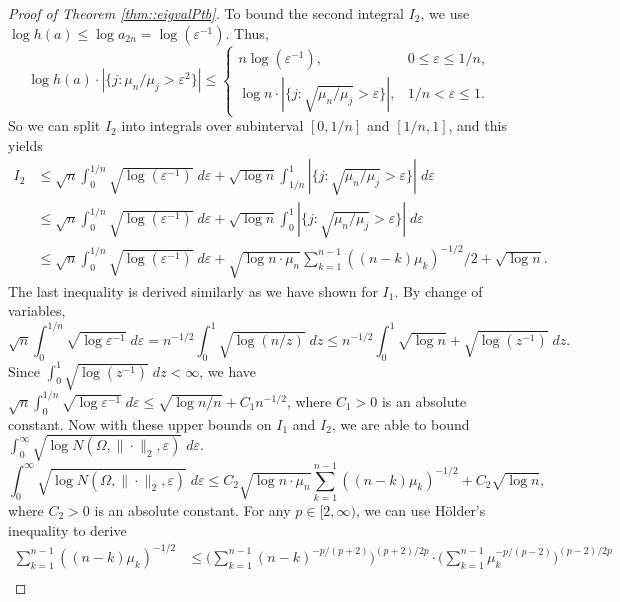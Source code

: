 \documentclass[12pt]{article}%
\theoremstyle{plain}%
\theoremstyle{remark}
\begin{document}
\begin{proof}[Proof of Theorem \ref{thm::eigvalPtb}]
To bound the second integral $I_2$, we use $\log h(a) \le \log a_{2n} = \log (\varepsilon^{-1})$. Thus, 
\begin{equation*}
\log h(a) \cdot  | \{ j: \mu_n / \mu_j > \varepsilon^2 \}| \le \begin{cases}
n \log (\varepsilon^{-1}), & 0 \le \varepsilon \le 1/n,  \\
\log n \cdot | \{ j: \sqrt{\mu_n / \mu_j} > \varepsilon \}|, & 1/n < \varepsilon \le 1.
\end{cases}
\end{equation*}
So we can split $I_2$ into integrals over subinterval $[0,1/n]$ and $[1/n, 1]$, and this yields
\begin{align*}
I_2 &\le \sqrt{n} \int_0^{1/n} \sqrt{ \log (\varepsilon^{-1}) }\; d\varepsilon + \sqrt{\log n} \int_{1/n}^1 | \{ j: \sqrt{\mu_n / \mu_j} > \varepsilon \}| \; d\varepsilon \\
&\le \sqrt{n} \int_0^{1/n} \sqrt{ \log (\varepsilon^{-1}) }\; d\varepsilon+ \sqrt{\log n} \int_0^1 | \{ j: \sqrt{\mu_n / \mu_j} > \varepsilon \}| \; d\varepsilon \\
&\le \sqrt{n} \int_0^{1/n} \sqrt{ \log (\varepsilon^{-1}) }\; d\varepsilon + \sqrt{\log n  \cdot \mu_n} \sum_{k=1}^{n-1} ( (n-k) \mu_k)^{-1/2} /2 + \sqrt{\log n}.
\end{align*}
The last inequality is derived similarly as we have shown for $I_1$. By change of variables,
\begin{equation*}
\sqrt{n} \int_0^{1/n} \sqrt{ \log \varepsilon^{-1} }\; d\varepsilon = n^{-1/2} \int_0^1 \sqrt{ \log (n/z)} \; dz \le n^{-1/2} \int_0^1 \sqrt{\log n} + \sqrt{\log(z^{-1})} \;dz.
\end{equation*}
Since $\int_0^1 \sqrt{\log (z^{-1})} \; dz < \infty$, we have $\sqrt{n} \int_0^{1/n} \sqrt{ \log \varepsilon^{-1} }\; d\varepsilon  \le \sqrt{\log n/n} + C_1 n^{-1/2}$, where $C_1>0$ is an absolute constant. Now with these upper bounds on $I_1$ and $I_2$, we are able to bound $\int_0^{\infty}\sqrt{\log N(\Omega, \| \cdot \|_2, \varepsilon)} \; d\varepsilon$.
\begin{equation*}
\int_0^{\infty}\sqrt{\log N(\Omega, \| \cdot \|_2, \varepsilon)} \; d\varepsilon \le C_2 \sqrt{\log n \cdot \mu_n} \sum_{k=1}^{n-1} ( (n-k) \mu_k)^{-1/2} + C_2\sqrt{\log n} ,
\end{equation*}
where $C_2 >0$ is an absolute constant. For any $p \in [2, \infty)$, we can use H\"{o}lder's inequality to derive
\begin{align*}
\sum_{k=1}^{n-1} ( (n-k) \mu_k)^{-1/2} &\le \big( \sum_{k=1}^{n-1} (n-k)^{-p/(p+2)} \big)^{(p+2)/2p} \cdot \big( \sum_{k=1}^{n-1} \mu_k^{-p/(p-2)} \big)^{(p-2)/2p} \\

\end{align*}
\end{proof}
\end{document}
